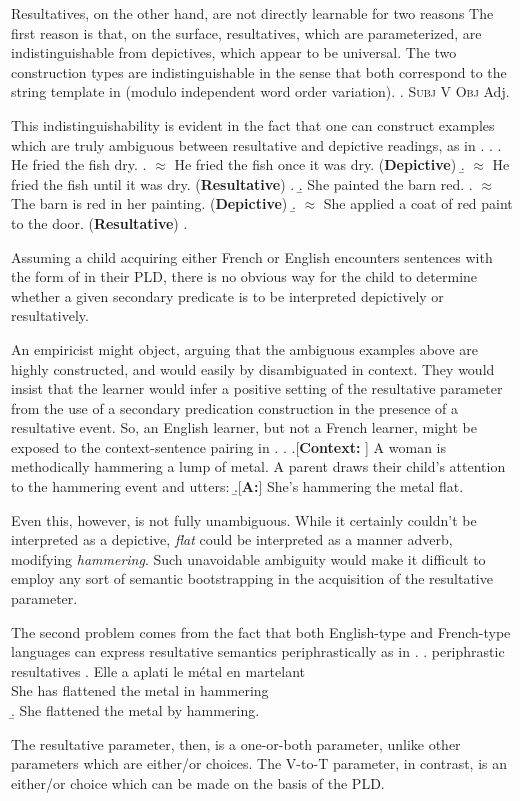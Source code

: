 \documentclass[MilwayThesis]{subfiles}
\begin{document}
Resultatives, on the other hand, are not directly learnable for two reasons
The first reason is that, on the surface, resultatives, which are parameterized, are indistinguishable from depictives, which appear to be universal.
The two construction types are indistinguishable in the sense that both correspond to the string template in \Next (modulo independent word order variation).
\ex. \textsc{Subj} V \textsc{Obj} Adj.

This indistinguishability is evident in the fact that one can construct examples which are truly ambiguous between resultative and depictive readings, as in \Next.
\ex. 
\a. He fried the fish dry.
\a. $\approx$ He fried the fish once it was dry. (\textbf{Depictive})
\b. $\approx$ He fried the fish until it was dry. (\textbf{Resultative})
\z.
\b. She painted the barn red.
\a. $\approx$ The barn is red in her painting. (\textbf{Depictive})
\b. $\approx$ She applied a coat of red paint to the door. (\textbf{Resultative})
\z.

Assuming a child acquiring either French or English encounters sentences with the form of \LLast in their PLD, there is no obvious way for the child to determine whether a given secondary predicate is to be interpreted depictively or resultatively.

An empiricist might object, arguing that the ambiguous examples above are highly constructed, and would easily by disambiguated in context.
They would insist that the learner would infer a positive setting of the resultative parameter from the use of a secondary predication construction in the presence of a resultative event.
So, an English learner, but not a French learner, might be exposed to the context-sentence pairing in \Next.
\ex. 
\a.[\textbf{Context:} ] A woman is methodically hammering a lump of metal.
A parent draws their child's attention to the hammering event and utters:
\b.[\textbf{A:}] She's hammering the metal flat.

Even this, however, is not fully unambiguous.
While it certainly couldn't be interpreted as a depictive, \textit{flat} could be interpreted as a manner adverb, modifying \textit{hammering}.
Such unavoidable ambiguity would make it difficult to employ any sort of semantic bootstrapping in the acquisition of the resultative parameter.

The second problem comes from the fact that both English-type and French-type languages can express resultative semantics periphrastically as in \Next.
\ex. periphrastic resultatives
\ag. Elle a aplati le m\'etal en martelant\\
She has flattened the metal in hammering\\
\b. She flattened the metal by hammering.


The resultative parameter, then, is a one-or-both parameter, unlike other parameters which are either/or choices.
The V-to-T parameter, in contrast, is an either/or choice which can be made on the basis of the PLD.
\end{document}
